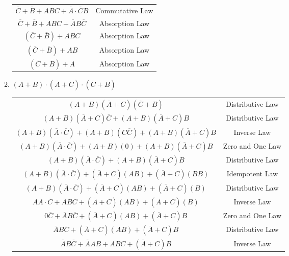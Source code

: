 \documentclass{article}
\begin{document}
\begin{enumerate}
\begin{enumerate}
\begin{tabular}{c | c}
                $\overline{C} + \overline{B} + ABC + \overline{A} \cdot \overline{C}B$ & Commutative Law\\
                $\overline{C} + \overline{B} + ABC + \overline{A} B \overline{C}$ & Absorption Law\\
                $(\overline{C} + \overline{B}) + ABC$ & Absorption Law\\
                $(\overline{C} + \overline{B}) + AB$ & Absorption Law\\
                $(\overline{C} + \overline{B}) + A$ & Absorption Law\\
            \end{tabular}
            \item $(A + B) \cdot (\overline{A} + C) \cdot (\overline{C} + B)$\\[0.25in]
            \begin{tabular}{c | c}
                $(A + B)(\overline{A} + C)(\overline{C} + B)$ & Distributive Law\\
                $(A + B)(\overline{A} + C)\overline{C} + (A+B)(\overline{A} + C)B$ & Distributive Law\\
                $(A+B)(\overline{A} \cdot \overline{C}) + (A+B)(C \overline{C}) + (A+B)(\overline{A} + C)B$ & Inverse Law\\
                $(A+B)(\overline{A} \cdot \overline{C}) + (A+B)(0) + (A+B)(\overline{A} + C)B$ & Zero and One Law\\
                $(A+B)(\overline{A} \cdot \overline{C}) + (A+B) (\overline{A} + C)B$ & Distributive Law\\
                $(A+B)(\overline{A} \cdot \overline{C}) + (\overline{A} + C)(AB) + (\overline{A} + C)(BB)$ & Idempotent Law\\
                $(A+B)(\overline{A} \cdot \overline{C}) + (\overline{A} + C)(AB) + (\overline{A} + C)(B)$ & Distributive Law\\
                $A\overline{A} \cdot \overline{C} + \overline{A}B\overline{C} + (\overline{A} + C)(AB) + (\overline{A} + C)(B)$ & Inverse Law\\
                $0\overline{C} + \overline{A}B\overline{C} + (\overline{A} + C)(AB) + (\overline{A} + C)B$ & Zero and One Law\\
                $\overline{A}B\overline{C} + (\overline{A} + C)(AB) + (\overline{A} + C)B$ & Distributive Law\\
                $\overline{A}B\overline{C} + \overline{A}AB + ABC + (\overline{A} + C)B$ & Inverse Law\\

\end{tabular}
\end{enumerate}
\end{enumerate}
\end{document}
